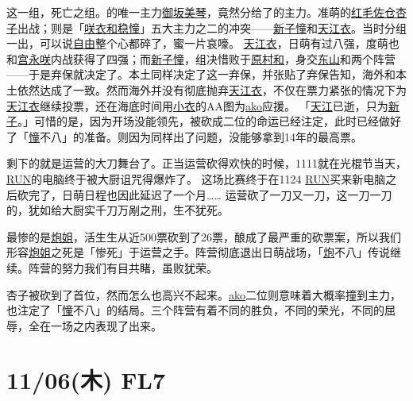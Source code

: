 这一组，死亡之组。的唯一主力\uline{御坂美琴}，竟然分给了的主力。准萌的\uline{红毛}\uline{佐仓杏子}出战；则是「\uline{咲衣和稳憧}」五大主力之二的冲突——\uline{新子憧}和\uline{天江衣}。当时分组一出，可以说\uline{自由}整个心都碎了，蜜一片哀嚎。
\uline{天江衣}，日萌有过八强，度萌也和\uline{宫永咲}内战获得了四强；而\uline{新子憧}，组决惜败于\uline{原村和}，身交\uline{东山}和两个阵营——于是弃保就决定了。本土同样决定了这一弃保，并张贴了弃保告知，海外和本土依然达成了一致。然而海外并没有彻底抛弃\uline{天江衣}，不仅在票力紧张的情况下为\uline{天江衣}继续投票，还在海底时间用\uline{小衣}的AA图为\uline{ako}应援。
「\uline{天江}已逝，只为\uline{新子}。」可惜的是，因为开场没能领先，被砍成二位的命运已经注定，此时已经做好了「\uline{憧}不八」的准备。则因为同样出了问题，没能够拿到14年的最高票。

剩下的就是运营的大刀舞台了。正当运营砍得欢快的时候，1111就在光棍节当天，\uline{RUN}的电脑终于被大厨诅咒得爆炸了。
这场比赛终于在1124 \uline{RUN}买来新电脑之后砍完了，日萌日程也因此延迟了一个月……
运营砍了一刀又一刀，这一刀一刀的，犹如给大厨实千刀万剐之刑，生不犹死。

最惨的是\uline{炮姐}，活生生从近500票砍到了26票，酿成了最严重的砍票案，所以我们形容\uline{炮姐}之死是「惨死」于运营之手。阵营彻底退出日萌战场，「\uline{炮}不八」传说继续。阵营的努力我们有目共睹，虽败犹荣。

杏子被砍到了首位，然而怎么也高兴不起来。\uline{ako}二位则意味着大概率撞到主力，也注定了「\uline{憧}不八」的结局。三个阵营有着不同的胜负，不同的荣光，不同的屈辱，全在一场之内表现了出来。

\clearpage

\section{11/06(木) FL7}


